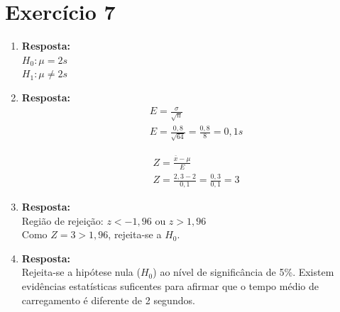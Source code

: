 \documentclass[11pt, a4paper]{article}
\begin{document}
\section{Exercício 7}
\begin{enumerate}
    \item \textbf{Resposta:}\\
    $H_0: \mu = 2s$\\$H_1: \mu \neq 2s$
    
    \item \textbf{Resposta:}
    \begin{align*}
        &E = \frac{\sigma}{\sqrt{n}}\\
        &E = \frac{0,8}{\sqrt{64}} = \frac{0,8}{8} = 0,1s
    \end{align*}

    \begin{align*}
        &Z = \frac{\bar{x} - \mu}{E}\\
        &Z = \frac{2,3 - 2}{0,1} = \frac{0,3}{0,1} = 3
    \end{align*}
    
    \item \textbf{Resposta:}\\
    Região de rejeição: $z < -1,96$ ou $z > 1,96$\\
    Como $Z = 3 > 1,96$, rejeita-se a $H_0$.
    
    \item \textbf{Resposta:}\\
    Rejeita-se a hipótese nula ($H_0$) ao nível de significância de 5\%. Existem evidências estatísticas suficentes para afirmar que o tempo médio de carregamento é diferente de 2 segundos.
\end{enumerate}
\end{document}
